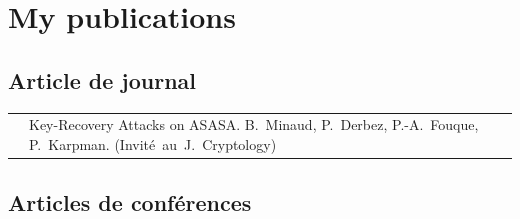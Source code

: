 \newcommand{\mybibtitle}[1]{\textsf{#1.}\hfil}
\newcommand{\mybibauth}[1]{#1.}
\newcommand{\mybibconf}[1]{\hspace*{\stretch{1}}\mbox{(#1)}}

\section[Mes publications]{My publications}

\subsection{Article de journal}

\noindent
\begin{tabularx}{\linewidth}{zX}
  \cite{asasajour} &
  \mybibtitle{Key-Recovery Attacks on ASASA}
  \mybibauth{B.~Minaud, P.~Derbez, P.-A.~Fouque, P.~Karpman}
  \mybibconf{Invité au J. Cryptology} \\
\end{tabularx}

\subsection{Articles de conférences}

